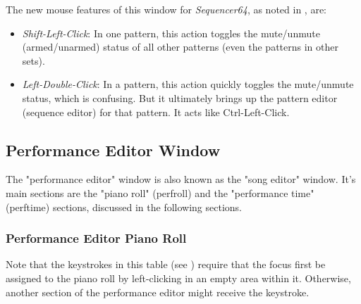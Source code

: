    The new mouse features of this window for \textsl{Sequencer64},
   as noted in , are:

   \begin{itemize}
      \item \textsl{Shift-Left-Click}:
         In one pattern, this action toggles the mute/unmute (armed/unarmed)
         status of all other patterns (even the patterns in other sets).
      \item \textsl{Left-Double-Click}:
         In a pattern, this action quickly toggles the mute/unmute status,
         which is confusing.  But it ultimately brings up the pattern editor
         (sequence editor) for that pattern.  It acts like
         Ctrl-Left-Click.
   \end{itemize}

\subsection{Performance Editor Window}
\label{subsec:kbd_mouse_performance_editor_window}

   The "performance editor" window is also known as the "song editor" window.
   It's main sections are the "piano roll" (perfroll) and the "performance
   time" (perftime) sections, discussed in the following sections.

\subsubsection{Performance Editor Piano Roll}
\label{subsubsec:kbd_mouse_performance_editor_piano_roll}

   Note that the keystrokes in this table
   (see )
   require that the focus first be
   assigned to the piano roll by left-clicking in an empty area within it.
   Otherwise, another section of the performance editor might receive the
   keystroke.

